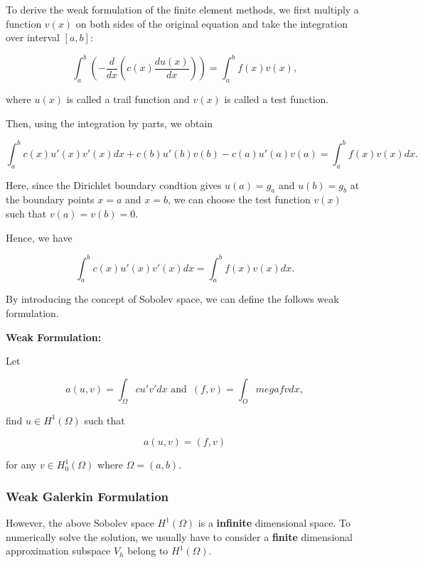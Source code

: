 \documentclass[11pt]{article}
\begin{document}
To derive the weak formulation of the finite element methods, we first
multiply a function \(v(x)\) on both sides of the original equation and
take the integration over interval \([a, b]\):

\begin{equation}
    \int_a^b \left(-\frac{d}{dx}\left(c(x)\frac{d u(x)}{dx}\right)\right)  = \int_a^b f(x)v(x),
\end{equation}

where \(u(x)\) is called a trail function and \(v(x)\) is called a test
function.

Then, using the integration by parts, we obtain

\begin{equation}
    \int_a^b c(x) u'(x)v'(x) dx + c(b)u'(b)v(b) - c(a)u'(a)v(a) = \int_a^b f(x)v(x) dx.
\end{equation}

Here, since the Dirichlet boundary condtion gives \(u(a) = g_a\) and
\(u(b) = g_b\) at the boundary points \(x = a\) and \(x = b\), we can
choose the test function \(v(x)\) such that \(v(a) = v(b) = 0\).

    Hence, we have

\begin{equation}
    \int_a^b c(x) u'(x)v'(x) dx = \int_a^b f(x)v(x) dx.
\end{equation}

By introducing the concept of Sobolev space, we can define the follows
weak formulation.

\textbf{Weak Formulation:}

Let

\begin{equation}
    a(u, v)= \int_\Omega c u'v' dx\,\,\text{and }\, (f, v)=\int_Omega fv dx, 
\end{equation}

find \(u \in H^1(\Omega)\) such that

\begin{equation}
    a(u, v) = (f, v)
\end{equation}

for any \(v \in H_0^1(\Omega)\) where \(\Omega = (a, b)\).

    \subsubsection{Weak Galerkin
Formulation}\label{weak-galerkin-formulation}

However, the above Sobolev space \(H^1(\Omega)\) is a \textbf{infinite}
dimensional space. To numerically solve the solution, we usually have to
consider a \textbf{finite} dimensional approximation subspace \(V_h\)
belong to \(H^1(\Omega)\).
\end{document}
